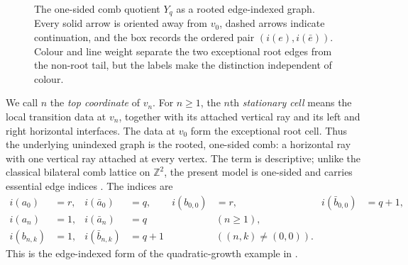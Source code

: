 \documentclass[11pt,reqno]{amsart}
\numberwithin{equation}{section}
\theoremstyle{definition}
\theoremstyle{remark}
\begin{document}
\begin{figure}[H]
\caption{The one-sided comb quotient $Y_q$ as a rooted edge-indexed graph.
Every solid arrow is oriented away from $v_0$, dashed arrows indicate
continuation, and the box records the ordered pair $(i(e),i(\bar e))$.
Colour and line weight separate the two exceptional root edges from the
non-root tail, but the labels make the distinction independent of colour.}
\label{fig:comb}
\end{figure}

We call $n$ the \emph{top coordinate} of $v_n$.  For $n\ge1$, the $n$th
\emph{stationary cell} means the local transition data at $v_n$, together with
its attached vertical ray and its left and right horizontal interfaces.  The
data at $v_0$ form the exceptional root cell.
Thus the underlying unindexed graph is the rooted, one-sided comb: a
horizontal ray with one vertical ray attached at every vertex.  The term is
descriptive; unlike the classical bilateral comb lattice on $\mathbb Z^2$,
the present model is one-sided and carries essential edge indices
\cite{KrishnapurPeres2004}.
The indices are
\begin{align}
 i(a_0)&=r,&i(\bar a_0)&=q,
 &i(b_{0,0})&=r,&i(\bar b_{0,0})&=q+1,\label{eq:rootindices}\\
 i(a_n)&=1,&i(\bar a_n)&=q &&(n\ge1),\label{eq:horizontalindices}\\
 i(b_{n,k})&=1,&i(\bar b_{n,k})&=q+1
 &&((n,k)\ne(0,0)).\label{eq:verticalindices}
\end{align}
This is the edge-indexed form of the quadratic-growth example in
\cite[pp.~305--306]{BroiseParkkonenPaulin2021}.
\end{document}
